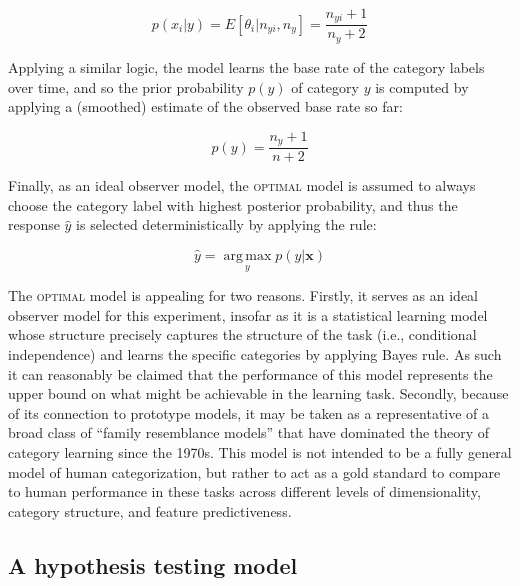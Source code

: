 \documentclass[a4paper, doc, floatsintext]{apa6}
\begin{document}
\begin{equation}
 p(x_{i}|y) = E[\theta_i|n_{yi},n_y] = \frac{n_{yi} + 1}{n_y + 2}
\label{feature-learning}
\end{equation}

Applying a similar logic, the model learns the base rate of the category labels over time, and so the prior probability $p(y)$ of category $y$ is computed by applying a (smoothed) estimate of the observed base rate so far:

\begin{equation}
p(y) = \frac{n_y + 1}{n+2}
\end{equation}

Finally, as an ideal observer model, the \textsc{optimal} model is assumed to always choose the category label with highest posterior probability, and thus the response $\hat y$ is selected deterministically by applying the rule:

\begin{equation}
\hat{y} = \underset{y}{\operatorname{arg\,max}} p(y|\textbf{x})
\label{naive-bayes}
\end{equation}

The \textsc{optimal} model is appealing for two reasons. Firstly, it serves as an ideal observer model for this experiment, insofar as it is a statistical learning model whose structure precisely captures the structure of the task (i.e., conditional independence) and learns the specific categories by applying Bayes rule. As such it can reasonably be claimed that the performance of this model represents the upper bound on what might be achievable in the learning task. Secondly, because of its connection to prototype models, it may be taken as a representative of a broad class of ``family resemblance models'' that have dominated the theory of category learning since the 1970s. This model is not intended to be a fully general model of human categorization, but rather to act as a gold standard to compare to human performance in these tasks across different levels of dimensionality, category structure, and feature predictiveness.

\subsection{A hypothesis testing model}
\end{document}
